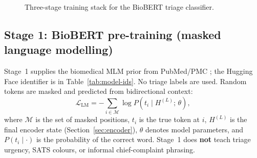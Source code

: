 \begin{figure}[H]
\centering
{}
\caption{Three-stage training stack for the BioBERT triage classifier.}
\label{fig:training-stages}
\end{figure}

\subsection{Stage 1: BioBERT pre-training (masked language modelling)}
\label{sec:mlm}

Stage~1 supplies the biomedical MLM prior from PubMed/PMC \citep{lee2020biobert}; the Hugging Face identifier is in Table~\ref{tab:model-ids}. No triage labels are used. Random tokens are masked and predicted from bidirectional context:
\begin{equation}
  \mathcal{L}_{\mathrm{LM}} = -\sum_{i \in \mathcal{M}} \log P(t_i \mid H^{(L)};\, \theta),
\end{equation}
where \(\mathcal{M}\) is the set of masked positions, \(t_i\) is the true token at \(i\), \(H^{(L)}\) is the final encoder state (Section~\ref{sec:encoder}), \(\theta\) denotes model parameters, and \(P(t_i \mid \cdot)\) is the probability of the correct word. Stage~1 does \textbf{not} teach triage urgency, SATS colours, or informal chief-complaint phrasing.

